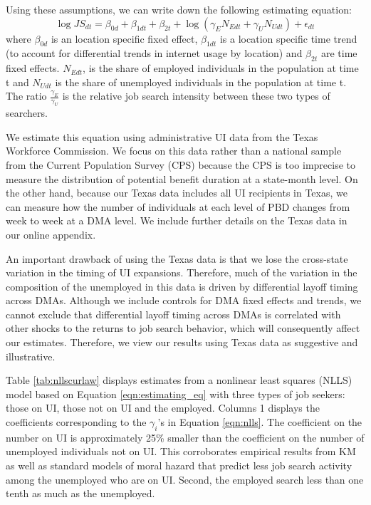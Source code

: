 \documentclass[12pt]{article}
\begin{document}
\begin{spacing}{2}
Using these assumptions, we can write down the following estimating equation:
\begin{equation}\label{eqn:estimating_eq}
\log{JS}_{dt} =\beta_{0d} + \beta_{1dt} + \beta_{2t}+\log{(\gamma_{E}N_{Edt}+\gamma_{U}N_{Udt})}+\epsilon_{dt}
\end{equation}
where $\beta_{0d}$ is an location specific fixed effect, $\beta_{1dt}$ is a location specific time trend (to account for differential trends in internet usage by location) and $\beta_{2t}$ are time fixed effects. $N_{Edt}$, is the share of employed individuals in the population at time t and $N_{Udt}$ is the share of unemployed individuals in the population at time t. The ratio  $\frac{\gamma_{E}}{\gamma_{U}}$ is the relative job search intensity between these two types of searchers.

We estimate this equation using administrative UI data from the Texas Workforce Commission. We focus on this data rather than a national sample from the Current Population Survey (CPS) because the CPS is too imprecise to measure the distribution of potential benefit duration at a state-month level. On the other hand, because our Texas data includes all UI recipients in Texas, we can measure how the number of individuals at each level of PBD changes from week to week at a DMA level. We include further details on the Texas data in our online appendix. 

An important drawback of using the Texas data is that we lose the cross-state variation in the timing of UI expansions. Therefore, much of the variation in the composition of the unemployed in this data is driven by differential layoff timing across DMAs. Although we include controls for DMA fixed effects and trends, we cannot exclude that differential layoff timing across DMAs is correlated with other shocks to the returns to job search behavior, which will consequently affect our estimates. Therefore, we view our results using Texas data as suggestive and illustrative.

Table \ref{tab:nllscurlaw} displays estimates from a nonlinear least squares (NLLS) model based on Equation \ref{eqn:estimating_eq} with three types of job seekers: those on UI, those not on UI and the employed. Columns 1 displays the coefficients corresponding to the $\gamma_i$'s in Equation \ref{eqn:nlls}. The coefficient on the number on UI is approximately 25\% smaller than the coefficient on the number of unemployed individuals not on UI. This corroborates empirical results from KM as well as standard models of moral hazard that predict less job search activity among the unemployed who are on UI. Second, the employed search less than one tenth as much as the unemployed.


\end{spacing}
\end{document}
